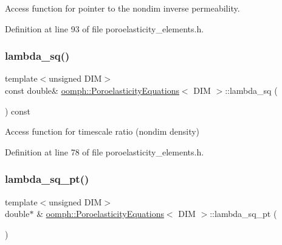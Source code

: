 Access function for pointer to the nondim inverse permeability. 



Definition at line 93 of file poroelasticity\+\_\+elements.\+h.

\mbox{\label{classoomph_1_1PoroelasticityEquations_abf4d66cc18272c1c9cab2947f55a23e5}} 
\subsubsection{\texorpdfstring{lambda\+\_\+sq()}{lambda\_sq()}}
{\footnotesize\ttfamily template$<$unsigned D\+IM$>$ \\
const double\& \hyperlink{classoomph_1_1PoroelasticityEquations}{oomph\+::\+Poroelasticity\+Equations}$<$ D\+IM $>$\+::lambda\+\_\+sq (\begin{DoxyParamCaption}{ }\end{DoxyParamCaption}) const\hspace{0.3cm}{\ttfamily [inline]}}



Access function for timescale ratio (nondim density) 



Definition at line 78 of file poroelasticity\+\_\+elements.\+h.

\mbox{\label{classoomph_1_1PoroelasticityEquations_a139020479ff89b89394cad32595abcff}} 
\subsubsection{\texorpdfstring{lambda\+\_\+sq\+\_\+pt()}{lambda\_sq\_pt()}}
{\footnotesize\ttfamily template$<$unsigned D\+IM$>$ \\
double$\ast$ \& \hyperlink{classoomph_1_1PoroelasticityEquations}{oomph\+::\+Poroelasticity\+Equations}$<$ D\+IM $>$\+::lambda\+\_\+sq\+\_\+pt (\begin{DoxyParamCaption}{ }\end{DoxyParamCaption})\hspace{0.3cm}{\ttfamily [inline]}}



